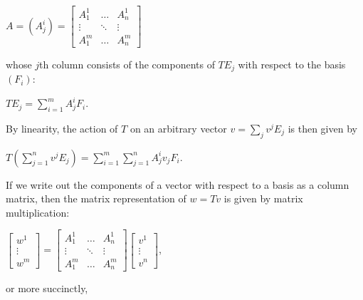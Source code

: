 \documentclass[12pt, a4paper]{article}
\begin{document}
\centerline{$A=(A^{i}_j)=\begin{bmatrix} A^1_1 & \dots & A^1_n \\ \vdots & \ddots & \vdots \\ A^m_1 & \dots & A^m_n \end{bmatrix}$}

\vspace{4mm}

whose $j$th column consists of the components of $TE_j$ with respect to the basis $(F_i)$:\par

\vspace{4mm}

\centerline{\large{$TE_j=\sum\limits_{i=1}^{m} A^i_jF_i$}.}

\vspace{4mm}

By linearity, the action of $T$ on an arbitrary vector $v=\sum_j v^jE_j$ is then given by\par

\vspace{4mm}

\centerline{\large{$T(\sum\limits_{j=1}^{n}v^jE_j)=\sum\limits_{i=1}^{m}\sum\limits_{j=1}^{n} A^i_jv_jF_i$}.}

\newpage

If we write out the components of a vector with respect to a basis as a column matrix, then the matrix representation of $w=Tv$ is given by matrix multiplication:\par

\vspace{4mm}

\centerline{$\begin{bmatrix} w^1 \\ \vdots \\ w^m \end{bmatrix}=\begin{bmatrix} A^1_1 & \dots & A^1_n \\ \vdots & \ddots & \vdots \\ A^m_1 & \dots & A^m_n \end{bmatrix}\begin{bmatrix} v^1 \\ \vdots \\ v^n \end{bmatrix}$,}

\vspace{4mm}

or more succinctly,\par
\end{document}
